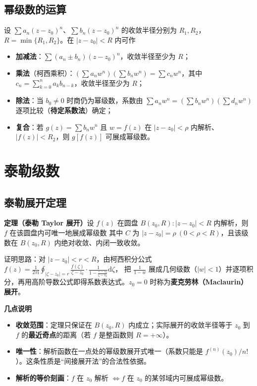 \subsection{幂级数的运算}
设 \(\sum a_{n}(z-z_{0})^{n}\)、\(\sum b_{n}(z-z_{0})^{n}\) 的收敛半径分别为 \(R_{1},R_{2}\)，\(R=\min\{R_{1},R_{2}\}\)。在 \(|z-z_{0}|<R\) 内可作
\begin{itemize}[leftmargin=2em]
  \item \textbf{加减法}：\(\sum(a_{n}\pm b_{n})(z-z_{0})^{n}\)，收敛半径至少为 \(R\)；
  \item \textbf{乘法}（柯西乘积）：\(\left(\sum a_{n}w^{n}\right)\left(\sum b_{n}w^{n}\right)=\sum c_{n}w^{n}\)，其中 \(c_{n}=\sum\limits_{k=0}^{n}a_{k}b_{n-k}\)，收敛半径至少为 \(R\)；
  \item \textbf{除法}：当 \(b_{0}\neq 0\) 时商仍为幂级数，系数由 \(\sum a_{n}w^{n}=\left(\sum b_{n}w^{n}\right)\left(\sum d_{n}w^{n}\right)\) 逐项比较（\textbf{待定系数法}）确定；
  \item \textbf{复合}：若 \(g(z)=\sum b_{n}w^{n}\) 且 \(w=f(z)\) 在 \(|z-z_{0}|<\rho\) 内解析、\(|f(z)|<R_{2}\)，则 \(g[f(z)]\) 可展成幂级数。
\end{itemize}

\section{泰勒级数}

\subsection{泰勒展开定理}
\textbf{定理（泰勒 Taylor 展开）}\quad 设 \(f(z)\) 在圆盘 \(B(z_{0},R):|z-z_{0}|<R\) 内解析，则 \(f\) 在该圆盘内可唯一地展成幂级数
其中 \(C\) 为 \(|z-z_{0}|=\rho\ (0<\rho<R)\)，且该级数在 \(B(z_{0},R)\) 内绝对收敛、内闭一致收敛。

证明思路：对 \(|z-z_{0}|<r<R\)，由柯西积分公式
\(f(z)=\frac{1}{2\pi\mathrm{i}}\oint_{|\zeta-z_{0}|=r}\frac{f(\zeta)}{\zeta-z_{0}}\cdot\frac{1}{1-\frac{z-z_{0}}{\zeta-z_{0}}}\mathrm{d}\zeta\)，
把 \(\frac{1}{1-w}\) 展成几何级数（\(|w|<1\)）并逐项积分，再用高阶导数公式即得系数表达式。\(z_{0}=0\) 时称为\textbf{麦克劳林（Maclaurin）展开}。

\textbf{几点说明}
\begin{itemize}[leftmargin=2em]
  \item \textbf{收敛范围}：定理只保证在 \(B(z_{0},R)\) 内成立；实际展开的收敛半径等于 \(z_{0}\) 到 \(f\) 的\textbf{最近奇点}的距离（若 \(f\) 是整函数则 \(R=+\infty\)）。
  \item \textbf{唯一性}：解析函数在一点处的幂级数展开式唯一（系数只能是 \(f^{(n)}(z_{0})/n!\)）。这条性质是“间接展开法”的合法性依据。
  \item \textbf{解析的等价刻画}：\(f\) 在 \(z_{0}\) 解析 \(\iff f\) 在 \(z_{0}\) 的某邻域内可展成幂级数。
\end{itemize}

